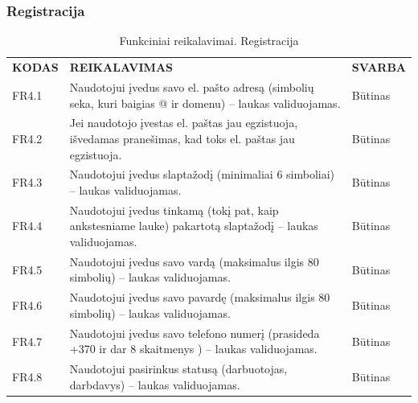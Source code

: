 \documentclass{VUMIFPSkursinis}
\begin{document}
\subsubsection{Registracija}
\begin{table}[H]
\caption{Funkciniai reikalavimai. Registracija}
\centering
\normalsize
\begin{tabular}{|p{2cm}|p{10cm}|p{3cm}|}
\hline
\rowcolor{gray!30}
\multicolumn{3}{|l|}{\textbf{4. Registracija}} \\ \hline
\textbf{KODAS}& \multicolumn{1}{m{10cm}|}{\textbf{REIKALAVIMAS}} & \textbf{SVARBA} \\ \hline
FR4.1 & \multicolumn{1}{m{10cm}|}{Naudotojui įvedus savo el. pašto adresą (simbolių seka, kuri baigias @ ir domenu) – laukas validuojamas.} & Būtinas \\ \hline
FR4.2 & \multicolumn{1}{m{10cm}|}{Jei naudotojo įvestas el. paštas jau egzistuoja, išvedamas pranešimas, kad toks el. paštas jau egzistuoja.} & Būtinas \\ \hline
FR4.3 & \multicolumn{1}{m{10cm}|}{Naudotojui įvedus slaptažodį (minimaliai 6 simboliai) – laukas validuojamas.} & Būtinas \\ \hline
FR4.4 & \multicolumn{1}{m{10cm}|}{Naudotojui įvedus tinkamą (tokį pat, kaip ankstesniame lauke) pakartotą slaptažodį – laukas validuojamas.} & Būtinas \\ \hline
FR4.5 & \multicolumn{1}{m{10cm}|}{Naudotojui įvedus savo vardą (maksimalus ilgis 80 simbolių) – laukas validuojamas.} & Būtinas \\ \hline
FR4.6 & \multicolumn{1}{m{10cm}|}{Naudotojui įvedus savo pavardę (maksimalus ilgis 80 simbolių) – laukas validuojamas.} & Būtinas \\ \hline
FR4.7 & \multicolumn{1}{m{10cm}|}{Naudotojui įvedus savo telefono numerį (prasideda +370 ir dar 8 skaitmenys ) – laukas validuojamas.} & Būtinas \\ \hline
FR4.8 & \multicolumn{1}{m{10cm}|}{Naudotojui pasirinkus statusą (darbuotojas, darbdavys) – laukas validuojamas.} & Būtinas \\ \hline
\end{tabular}
\end{table}
\end{document}
